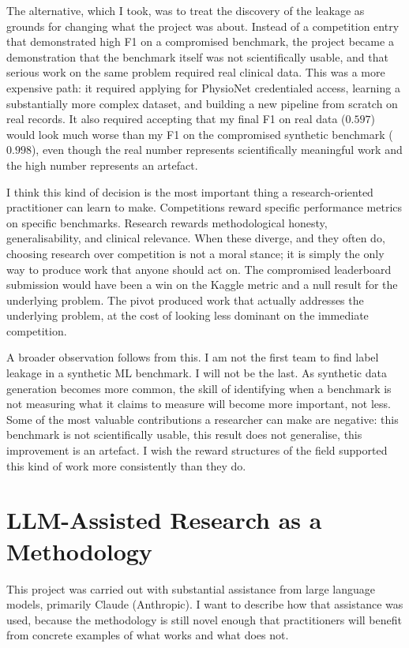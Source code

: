 The alternative, which I took, was to treat the discovery of the leakage as grounds for changing what the project was about. Instead of a competition entry that demonstrated high F1 on a compromised benchmark, the project became a demonstration that the benchmark itself was not scientifically usable, and that serious work on the same problem required real clinical data. This was a more expensive path: it required applying for PhysioNet credentialed access, learning a substantially more complex dataset, and building a new pipeline from scratch on real records. It also required accepting that my final F1 on real data ($0.597$) would look much worse than my F1 on the compromised synthetic benchmark ($0.998$), even though the real number represents scientifically meaningful work and the high number represents an artefact.

I think this kind of decision is the most important thing a research-oriented practitioner can learn to make. Competitions reward specific performance metrics on specific benchmarks. Research rewards methodological honesty, generalisability, and clinical relevance. When these diverge, and they often do, choosing research over competition is not a moral stance; it is simply the only way to produce work that anyone should act on. The compromised leaderboard submission would have been a win on the Kaggle metric and a null result for the underlying problem. The pivot produced work that actually addresses the underlying problem, at the cost of looking less dominant on the immediate competition.

A broader observation follows from this. I am not the first team to find label leakage in a synthetic ML benchmark. I will not be the last. As synthetic data generation becomes more common, the skill of identifying when a benchmark is not measuring what it claims to measure will become more important, not less. Some of the most valuable contributions a researcher can make are negative: this benchmark is not scientifically usable, this result does not generalise, this improvement is an artefact. I wish the reward structures of the field supported this kind of work more consistently than they do.

\section{LLM-Assisted Research as a Methodology}

This project was carried out with substantial assistance from large language models, primarily Claude (Anthropic). I want to describe how that assistance was used, because the methodology is still novel enough that practitioners will benefit from concrete examples of what works and what does not.

